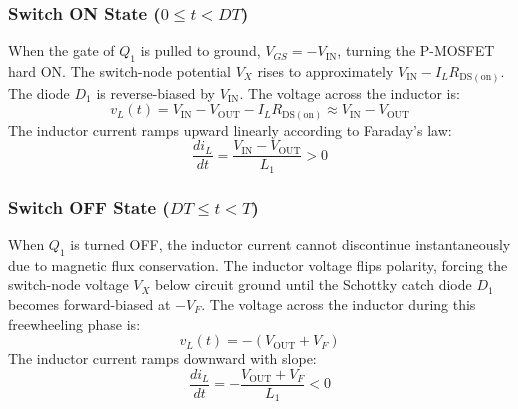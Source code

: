 \documentclass[12pt,a4paper]{article}
\newcommand{\Vout}{V_{\mathrm{OUT}}}
\newcommand{\Vin}{V_{\mathrm{IN}}}
\newcommand{\Vx}{V_X}
\newcommand{\Rdson}{R_{\mathrm{DS(on)}}}
\begin{document}
\subsubsection{Switch ON State \texorpdfstring{($0 \le t < DT$)}{(0 <= t < DT)}}
When the gate of $Q_1$ is pulled to ground, $V_{GS} = -\Vin$, turning the P-MOSFET hard ON. The switch-node potential $\Vx$ rises to approximately $\Vin - I_L \Rdson$. The diode $D_1$ is reverse-biased by $\Vin$. The voltage across the inductor is:
\begin{equation}
    v_L(t) = \Vin - \Vout - I_L \Rdson \approx \Vin - \Vout
    \label{eq:vl_on}
\end{equation}
The inductor current ramps upward linearly according to Faraday's law:
\begin{equation}
    \frac{di_L}{dt} = \frac{\Vin - \Vout}{L_1} > 0
    \label{eq:dil_dt_on}
\end{equation}

\subsubsection{Switch OFF State \texorpdfstring{($DT \le t < T$)}{(DT <= t < T)}}
When $Q_1$ is turned OFF, the inductor current cannot discontinue instantaneously due to magnetic flux conservation. The inductor voltage flips polarity, forcing the switch-node voltage $\Vx$ below circuit ground until the Schottky catch diode $D_1$ becomes forward-biased at $-V_F$. The voltage across the inductor during this freewheeling phase is:
\begin{equation}
    v_L(t) = -(\Vout + V_F)
    \label{eq:vl_off}
\end{equation}
The inductor current ramps downward with slope:
\begin{equation}
    \frac{di_L}{dt} = -\frac{\Vout + V_F}{L_1} < 0
    \label{eq:dil_dt_off}
\end{equation}
\end{document}
